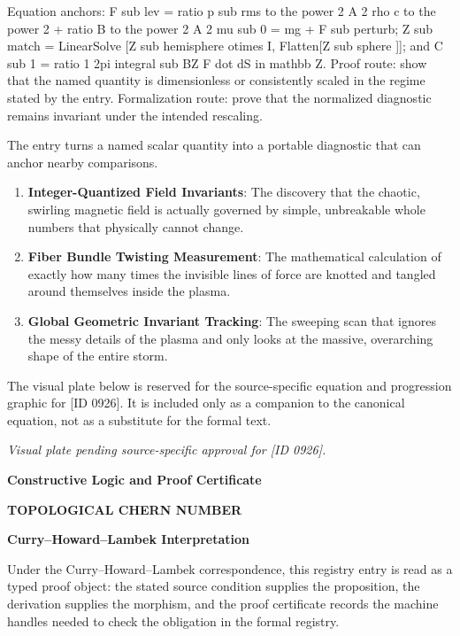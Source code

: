 Equation anchors: F sub lev = ratio p sub rms to the power 2 A 2 rho c to the power 2 + ratio B to the power 2 A 2 mu sub 0 = mg + F sub perturb; Z sub match = LinearSolve [Z sub hemisphere otimes I, Flatten[Z sub sphere ]]; and C sub 1 = ratio 1 2pi integral sub BZ F dot dS in mathbb Z. Proof route: show that the named quantity is dimensionless or consistently scaled in the regime stated by the entry. Formalization route: prove that the normalized diagnostic remains invariant under the intended rescaling.

The entry turns a named scalar quantity into a portable diagnostic that can anchor nearby comparisons.
\endgroup

\begin{enumerate}[leftmargin=1.6em,itemsep=6pt,topsep=4pt]
\item \textbf{Integer-Quantized Field Invariants}: The discovery that the chaotic, swirling magnetic field is actually governed by simple, unbreakable whole numbers that physically cannot change.
\item \textbf{Fiber Bundle Twisting Measurement}: The mathematical calculation of exactly how many times the invisible lines of force are knotted and tangled around themselves inside the plasma.
\item \textbf{Global Geometric Invariant Tracking}: The sweeping scan that ignores the messy details of the plasma and only looks at the massive, overarching shape of the entire storm.
\end{enumerate}

\begingroup\footnotesize\sloppy
The visual plate below is reserved for the source-specific equation and progression graphic for [ID 0926]. It is included only as a companion to the canonical equation, not as a substitute for the formal text.
\par\endgroup
\begingroup\footnotesize\itshape
Visual plate pending source-specific approval for [ID 0926].
\par\endgroup

\clearpage
\begingroup\tzpsupportsetup
\noindent\textbf{\fontsize{10.8pt}{12.8pt}\selectfont [ID 0926] Constructive Logic and Proof Certificate}\par
\noindent\textbf{\fontsize{10pt}{12pt}\selectfont TOPOLOGICAL CHERN NUMBER}\par
\vspace{0.45em}
\begingroup
\footnotesize
\setlength{\parskip}{0.22em}
\setlength{\parindent}{0pt}
\noindent\textbf{Curry--Howard--Lambek Interpretation}\par
Under the Curry--Howard--Lambek correspondence, this registry entry is read as a typed proof
object: the stated source condition supplies the proposition, the derivation supplies the
morphism, and the proof certificate records the machine handles needed to check the obligation
in the formal registry.

